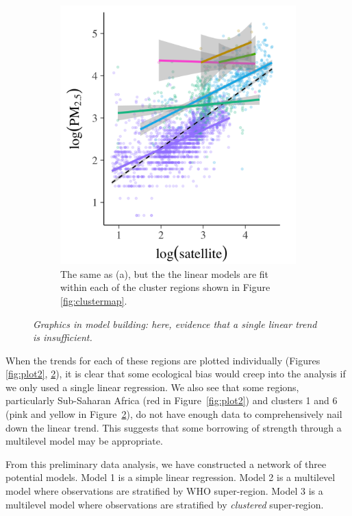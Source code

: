 \documentclass{statsoc}
\begin{document}
\begin{figure}
\begin{subfigure}{0.48\textwidth}
\includegraphics[width=\textwidth]{plot3.png}
\caption{The same as (a), but the the linear models are fit within each of the
cluster regions shown in Figure \ref{fig:clustermap}.}
\label{fig:plot3}
\end{subfigure}

\caption{\it Graphics in model building: here, evidence that a single linear
trend is insufficient.}
\end{figure}

When the trends for each of these regions are plotted individually (Figures
\ref{fig:plot2}, \ref{fig:plot3}), it is clear that some ecological bias would
creep into the analysis if we only used a single linear regression.  We also see
that some regions, particularly Sub-Saharan Africa (red in
Figure~\ref{fig:plot2}) and clusters 1 and 6 (pink and yellow in
Figure~\ref{fig:plot3}), do not have enough data to comprehensively nail down
the linear trend. This suggests that some borrowing of strength through a
multilevel model may be appropriate.

From this preliminary data analysis, we have constructed a network of three
potential models.  Model 1 is a simple linear regression. Model 2 is a
multilevel model where observations are stratified by WHO super-region. Model 3
is a multilevel model where observations are stratified by \emph{clustered}
super-region.
\end{document}
